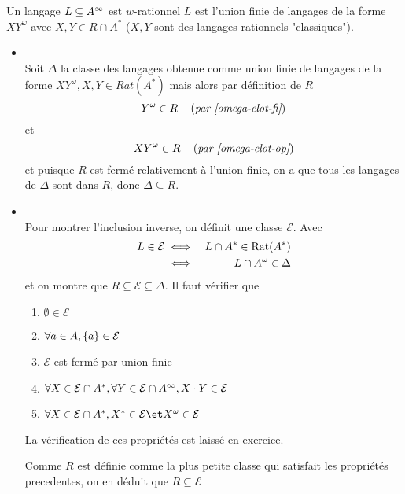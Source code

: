 \begin{prop}
	Un langage $L \subseteq A^{\infty}$ est $w$-rationnel \ssi $L$ est l'union finie de langages
	de la forme $XY^{\omega}$ avec $X,Y \in R \cap A^*$ ($X,Y$ sont des langages rationnels "classiques").
\end{prop}

\begin{proofI}
	\begin{itemize}
		\item {} \\
		      Soit $\Delta$ la classe des langages obtenue comme union finie de langages de la forme $XY^{\omega}, X,Y \in Rat(A^*)$
		      mais alors par définition de $R$
		      $$Y^{\omega} \in R \quad\left(\textit{par \ref{omega-clot-fi}}\right)$$
		      et
		      $$XY^{\omega} \in R \quad\left(\textit{par \ref{omega-clot-op}}\right)$$
		      et puisque $R$ est fermé relativement à l'union finie, on a que tous les langages de $\Delta$ sont dans $R$,
		      donc $\Delta \subseteq R$.
		\item {} \\

		      Pour montrer l'inclusion inverse, on définit une classe $\mathcal{E}$.
		      Avec
		      \begin{eqnarray*}
			      L \in \mathcal{E} &\iff& L \cap A^* \in \text{Rat}(A^*) \\
			      &\iff& L \cap A^{\omega} \in \Delta
		      \end{eqnarray*}
		      et on montre que $R \subseteq \mathcal{E} \subseteq \Delta$.
		      Il faut vérifier que
		      \begin{enumerate}
			      \item $\emptyset \in \mathcal{E}$
			      \item $\forall a \in A, \left\{a\right\} \in  \mathcal{E}$
			      \item $\mathcal{E}$ est fermé par union finie

			      \item $\forall X \in \mathcal{E} \cap A^*, \forall Y \in \mathcal{E} \cap A^{\infty}, X \cdot Y \in \mathcal{E}$
			      \item $\forall X \in \mathcal{E} \cap A^*, X^* \in \mathcal{E} \et X^{\omega} \in \mathcal{E}$
		      \end{enumerate}
		      La vérification de ces propriétés est laissé en exercice.

		      Comme $R$ est définie comme la plus petite classe qui satisfait
		      les propriétés precedentes, on en déduit que $R \subseteq \mathcal{E}$
	\end{itemize}
\end{proofI}


